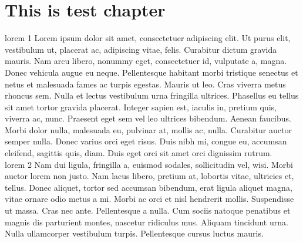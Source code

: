 \documentclass[12pt, a4paper, twoside]{report}
\begin{document}
\printnomenclature







\chapter{This is test chapter}

\gls{lorem 1}
Lorem ipsum dolor sit amet, consectetuer adipiscing elit. Ut purus elit, vestibulum ut,
placerat ac, adipiscing vitae, felis. Curabitur dictum gravida mauris. Nam arcu libero,
nonummy eget, consectetuer id, vulputate a, magna. Donec vehicula augue eu neque.
Pellentesque habitant morbi tristique senectus et netus et malesuada fames ac turpis
egestas. Mauris ut leo. Cras viverra metus rhoncus sem. Nulla et lectus vestibulum urna
fringilla ultrices. Phasellus eu tellus sit amet tortor gravida placerat. Integer sapien est,
iaculis in, pretium quis, viverra ac, nunc. Praesent eget sem vel leo ultrices bibendum.
Aenean faucibus. Morbi dolor nulla, malesuada eu, pulvinar at, mollis ac, nulla. Curabitur
auctor semper nulla. Donec varius orci eget risus. Duis nibh mi, congue eu, accumsan
eleifend, sagittis quis, diam. Duis eget orci sit amet orci dignissim rutrum.\\

\gls{lorem 2}
Nam dui ligula, fringilla a, euismod sodales, sollicitudin vel, wisi. Morbi auctor lorem
non justo. Nam lacus libero, pretium at, lobortis vitae, ultricies et, tellus. Donec aliquet,
tortor sed accumsan bibendum, erat ligula aliquet magna, vitae ornare odio metus a mi.
Morbi ac orci et nisl hendrerit mollis. Suspendisse ut massa. Cras nec ante. Pellentesque
a nulla. Cum sociis natoque penatibus et magnis dis parturient montes, nascetur ridiculus
mus. Aliquam tincidunt urna. Nulla ullamcorper vestibulum turpis. Pellentesque cursus
luctus mauris.\\
\end{document}
